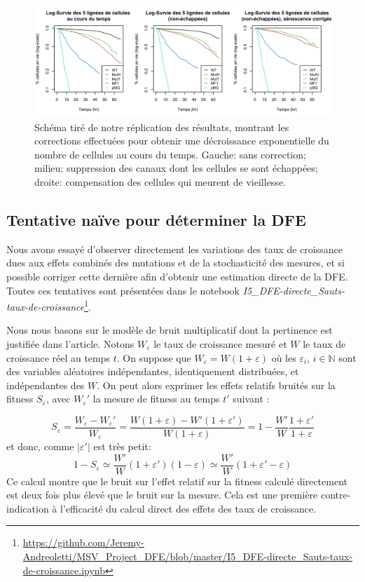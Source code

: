 \documentclass[12pt]{article}
\newcommand{\abs}[1]{\left|#1\right|}
\newcommand{\En}{\mathbb{N}}
\begin{document}
\begin{figure}[h]
  \begin{center}
    \vspace{3mm}
    \includegraphics[scale=0.3]{../Img/Survival.png}
  \end{center} 
  \caption{\label{fig:survival}Schéma tiré de notre réplication des résultats, montrant les corrections effectuées pour obtenir une décroissance exponentielle du nombre de cellules au cours du temps. Gauche: sans correction; milieu: suppression des canaux dont les cellules se sont échappées; droite: compensation des cellules qui meurent de vieillesse.}
\end{figure}

\FloatBarrier
\subsection{Tentative naïve pour déterminer la DFE}

Nous avons essayé d'observer directement les variations des taux de croissance dues aux effets combinés des mutations et de la stochasticité des mesures, et si possible corriger cette dernière afin d'obtenir une estimation directe de la DFE. Toutes ces tentatives sont présentées dans le notebook \emph{I5\_DFE-directe\_Sauts-taux-de-croissance}\footnote{\url{https://github.com/Jeremy-Andreoletti/MSV_Project_DFE/blob/master/I5_DFE-directe_Sauts-taux-de-croissance.ipynb}}.

Nous nous basons sur le modèle de bruit multiplicatif dont la pertinence est justifiée dans l'article.
Notons $W_\varepsilon$ le taux de croissance mesuré et $W$ le taux de croissance réel au temps $t$. On suppose que $W_\varepsilon=W(1+\varepsilon)$ où les $\varepsilon_i$, $i\in\En$ sont des variables aléatoires indépendantes, identiquement distribuées, et indépendantes des $W$. On peut alors exprimer les effets relatifs bruités sur la fitness $S_\varepsilon$, avec $W_\varepsilon'$ la mesure de fitness au temps $t'$ suivant :

\[S_\varepsilon=\frac{W_\varepsilon - W_\varepsilon'}{W_\varepsilon} 
= \frac{W(1+\varepsilon) - W'(1+\varepsilon')}{W(1+\varepsilon)}
= 1 - \frac{W'}{W}\frac{1+\varepsilon'}{1+\varepsilon}\]
et donc, comme $\abs{\varepsilon'}$ est très petit:
\[1 - S_\varepsilon \simeq \frac{W'}{W}(1+\varepsilon')(1-\varepsilon)\simeq \frac{W'}{W}(1+\varepsilon'-\varepsilon)\]
Ce calcul montre que le bruit sur l'effet relatif sur la fitness calculé directement est deux fois plus élevé que le bruit sur la mesure. Cela est une première contre-indication à l'efficacité du calcul direct des effets des taux de croissance.
\end{document}
